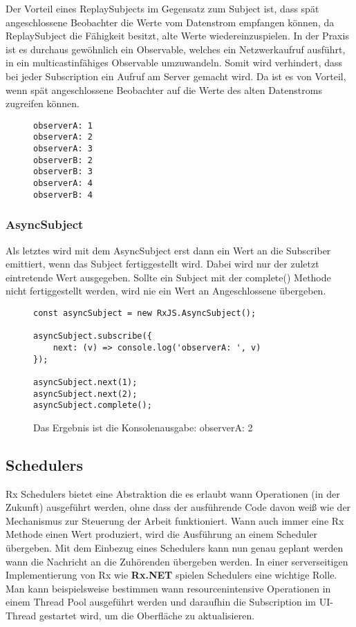 \noindent
Der Vorteil eines ReplaySubjects im Gegensatz zum Subject ist, dass spät angeschlossene Beobachter die Werte vom Datenstrom empfangen können, da ReplaySubject die Fähigkeit besitzt, alte Werte wiedereinzuspielen. In der Praxis ist es durchaus gewöhnlich ein Observable, welches ein Netzwerkaufruf ausführt, in ein multicastinfähiges Observable umzuwandeln. Somit wird verhindert, dass bei jeder Subscription ein Aufruf am Server gemacht wird. Da ist es von Vorteil, wenn spät angeschlossene Beobachter auf die Werte des alten Datenstroms zugreifen können.

\begin{figure}[H]
\begin{lstlisting}
observerA: 1
observerA: 2
observerA: 3
observerB: 2
observerB: 3
observerA: 4
observerB: 4
\end{lstlisting}
\end{figure}

\subsubsection{AsyncSubject}
Als letztes wird mit dem AsyncSubject erst dann ein Wert an die Subscriber emittiert, wenn das Subject fertiggestellt wird. Dabei wird nur der zuletzt eintretende Wert ausgegeben. Sollte ein Subject mit der complete() Methode nicht fertiggestellt werden, wird nie ein Wert an Angeschlossene übergeben.

\begin{figure}[H]
\begin{lstlisting}[basicstyle=\small]
const asyncSubject = new RxJS.AsyncSubject();

asyncSubject.subscribe({
    next: (v) => console.log('observerA: ', v)
});

asyncSubject.next(1);
asyncSubject.next(2);
asyncSubject.complete();
\end{lstlisting}
\caption{Das Ergebnis ist die Konsolenausgabe: \glqq observerA:  2 \grqq{}}
\end{figure}

\subsection{Schedulers}

Rx Schedulers bietet eine Abstraktion die es erlaubt wann Operationen (in der Zukunft) ausgeführt werden, ohne dass der ausführende Code davon weiß wie der Mechanismus zur Steuerung der Arbeit funktioniert. Wann auch immer eine Rx Methode einen Wert produziert, wird die Ausführung an einem Scheduler übergeben. Mit dem Einbezug eines Schedulers kann nun genau geplant werden wann die Nachricht an die Zuhörenden übergeben werden. In einer serverseitigen Implementierung von Rx wie \textbf{Rx.NET} spielen Schedulers eine wichtige Rolle. Man kann beispielsweise bestimmen wann resourcenintensive Operationen in einem Thread Pool ausgeführt werden und daraufhin die Subscription im UI-Thread gestartet wird, um die Oberfläche zu aktualisieren\cite{rx-schedulers}.\\

